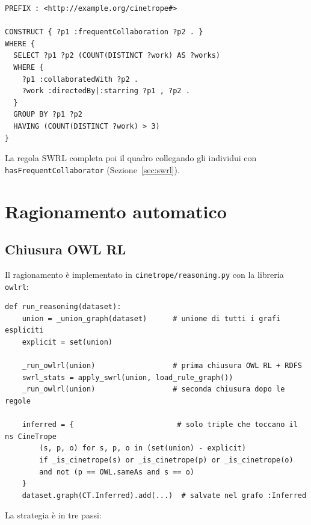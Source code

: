 \documentclass[a4paper,11pt]{article}
\newcommand{\code}[1]{\texttt{#1}}
\begin{document}
\begin{lstlisting}[style=sparql, caption={Rilevamento delle collaborazioni
frequenti: il conteggio che SWRL non pu\`o fare.}, label={lst:frequent}]
PREFIX : <http://example.org/cinetrope#>

CONSTRUCT { ?p1 :frequentCollaboration ?p2 . }
WHERE {
  SELECT ?p1 ?p2 (COUNT(DISTINCT ?work) AS ?works)
  WHERE {
    ?p1 :collaboratedWith ?p2 .
    ?work :directedBy|:starring ?p1 , ?p2 .
  }
  GROUP BY ?p1 ?p2
  HAVING (COUNT(DISTINCT ?work) > 3)
}
\end{lstlisting}

La regola SWRL completa poi il quadro collegando gli individui con
\code{hasFrequentCollaborator} (Sezione~\ref{sec:swrl}).

\section{Ragionamento automatico}\label{sec:reasoning}

\subsection{Chiusura OWL RL}

Il ragionamento \`e implementato in \code{cinetrope/reasoning.py} con la
libreria \code{owlrl}:

\begin{lstlisting}[style=py, caption={Esecuzione della chiusura OWL RL e
delle regole SWRL (cinetrope/reasoning.py).}]
def run_reasoning(dataset):
    union = _union_graph(dataset)      # unione di tutti i grafi espliciti
    explicit = set(union)

    _run_owlrl(union)                  # prima chiusura OWL RL + RDFS
    swrl_stats = apply_swrl(union, load_rule_graph())
    _run_owlrl(union)                  # seconda chiusura dopo le regole

    inferred = {                        # solo triple che toccano il ns CineTrope
        (s, p, o) for s, p, o in (set(union) - explicit)
        if _is_cinetrope(s) or _is_cinetrope(p) or _is_cinetrope(o)
        and not (p == OWL.sameAs and s == o)
    }
    dataset.graph(CT.Inferred).add(...)  # salvate nel grafo :Inferred
\end{lstlisting}

La strategia \`e in tre passi:
\end{document}
